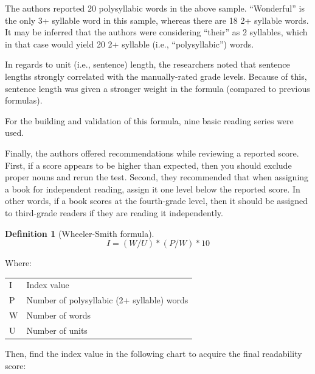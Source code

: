\documentclass[
]{book}
\theoremstyle{definition}
\newtheorem{definition}{Definition}[chapter]
\theoremstyle{definition}
\theoremstyle{definition}
\theoremstyle{definition}
\theoremstyle{remark}
\begin{document}
The authors reported 20 polysyllabic words in the above sample. ``Wonderful'' is the only 3+ syllable word in this sample, whereas there are 18 2+ syllable words. It may be inferred that the authors were considering ``their'' as 2 syllables, which in that case would yield 20 2+ syllable (i.e., ``polysyllabic'') words.

In regards to unit (i.e., sentence) length, the researchers noted that sentence lengths strongly correlated with the manually-rated grade levels. Because of this, sentence length was given a stronger weight in the formula (compared to previous formulas).

For the building and validation of this formula, nine basic reading series were used.

Finally, the authors offered recommendations while reviewing a reported score. First, if a score appears to be higher than expected, then you should exclude proper nouns and rerun the test. Second, they recommended that when assigning a book for independent reading, assign it one level below the reported score. In other words, if a book scores at the fourth-grade level, then it should be assigned to third-grade readers if they are reading it independently.

\begin{definition}[Wheeler-Smith formula]
\protect\hypertarget{def:wheelersmith}{}{\label{def:wheelersmith} {} }\[
I = (W/U)*(P/W)*10
\]
\end{definition}

\begin{minipage}{\textwidth}

Where:

\begin{longtable}[]{@{}
  >{\raggedright\arraybackslash}p{}
  >{\raggedright\arraybackslash}p{}@{}}
\toprule
\endhead
I & Index value \\
P & Number of polysyllabic (2+ syllable) words \\
W & Number of words \\
U & Number of units \\
\bottomrule
\end{longtable}

\end{minipage}

Then, find the index value in the following chart to acquire the final readability score:
\end{document}
